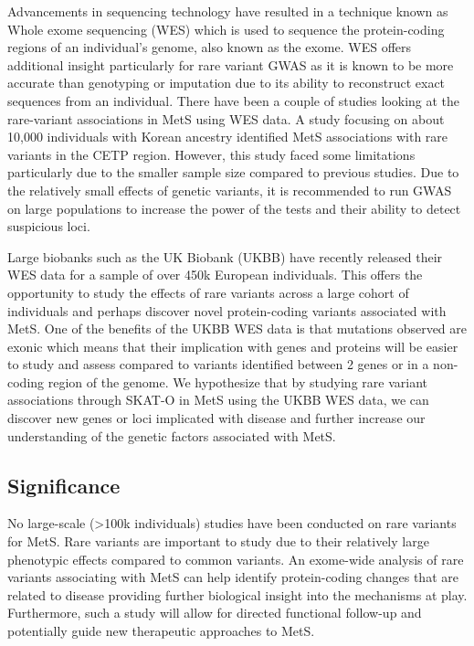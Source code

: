 \documentclass[11pt]{article}
\begin{document}
Advancements in sequencing technology have resulted in a technique known as Whole exome sequencing (WES) which is used to sequence the protein-coding regions of an individual's genome, also known as the exome. WES offers additional insight particularly for rare variant GWAS as it is known to be more accurate than genotyping or imputation due to its ability to reconstruct exact sequences from an individual. There have been a couple of studies looking at the rare-variant associations in MetS using WES data. A study focusing on about 10,000 individuals with Korean ancestry identified MetS associations with rare variants in the CETP region. However, this study faced some limitations particularly due to the smaller sample size compared to previous studies. Due to the relatively small effects of genetic variants, it is recommended to run GWAS on large populations to increase the power of the tests and their ability to detect suspicious loci.

Large biobanks such as the UK Biobank (UKBB) have recently released their WES data for a sample of over 450k European individuals. This offers the opportunity to study the effects of rare variants across a large cohort of individuals and perhaps discover novel protein-coding variants associated with MetS. One of the benefits of the UKBB WES data is that mutations observed are exonic which means that their implication with genes and proteins will be easier to study and assess compared to variants identified between 2 genes or in a non-coding region of the genome. We hypothesize that by studying rare variant associations through SKAT-O in MetS using the UKBB WES data, we can discover new genes or loci implicated with disease and further increase our understanding of the genetic factors associated with MetS.

\subsection*{Significance}

No large-scale (>100k individuals) studies have been conducted on rare variants for MetS. Rare variants are important to study due to their relatively large phenotypic effects compared to common variants. An exome-wide analysis of rare variants associating with MetS can help identify protein-coding changes that are related to disease providing further biological insight into the mechanisms at play. Furthermore, such a study will allow for directed functional follow-up and potentially guide new therapeutic approaches to MetS.
\end{document}
